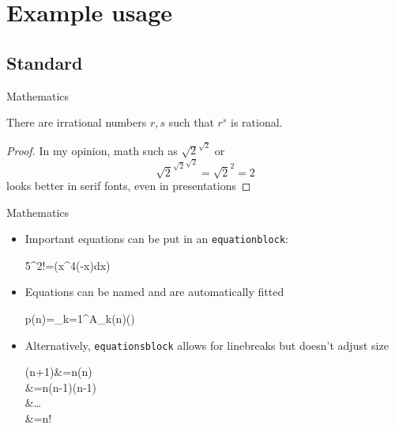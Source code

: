 \documentclass{beamer}
\begin{document}
\section{Example usage}
\subsection{Standard}

\begin{frame}{Mathematics}
\begin{theorem}
	There are irrational numbers $r,s$ such that $r^s$ is rational.
\end{theorem}
\begin{proof}
	In my opinion, math such as $\sqrt{2}^{\sqrt{2}}$ or 
	$$
	{\sqrt{2}^{\sqrt{2}}}^{\sqrt{2}}=\sqrt{2}^{2}=2
	$$ looks better in serif fonts, even in presentations
\end{proof}
\end{frame}
\begin{frame}{Mathematics}
\begin{itemize}
	\item Important equations can be put in an \texttt{equationblock}:
	\begin{equationblock}
		5^2!=\exp\left(\int x^4\exp(-x)\;dx\right)
	\end{equationblock}	
	\item Equations can be named and are automatically fitted
	\begin{equationblock}
		p(n)=\sum_{k=1}^{\infty}A_{k}(n)\left(\sinh{}\right)
	\end{equationblock}
	\item Alternatively, \texttt{equationsblock} allows for linebreaks but doesn't adjust size
	\begin{equationsblock}
		\Gamma(n+1)&=n\Gamma(n)\\
		  &=n(n-1)\Gamma(n-1)\\
		  &\dots\\
		  &=n!
	\end{equationsblock}
\end{itemize}
\end{frame}
\end{document}
